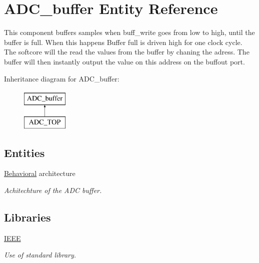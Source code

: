 \hypertarget{classADC__buffer}{\section{A\-D\-C\-\_\-buffer Entity Reference}
\label{classADC__buffer}
}


This component buffers samples when buff\-\_\-write goes from low to high, until the buffer is full. When this happens Buffer full is driven high for one clock cycle. The softcore will the read the values from the buffer by chaning the adress. The buffer will then instantly output the value on this address on the buffout port.  


Inheritance diagram for A\-D\-C\-\_\-buffer\-:\begin{figure}[H]
\begin{center}
\leavevmode
\includegraphics[height=2.000000cm]{classADC__buffer}
\end{center}
\end{figure}
\subsection*{Entities}
\begin{DoxyCompactItemize}
\item 
\hyperlink{classADC__buffer_1_1Behavioral}{Behavioral} architecture
\begin{DoxyCompactList}\small\item\em Achitechture of the A\-D\-C buffer. \end{DoxyCompactList}\end{DoxyCompactItemize}
\subsection*{Libraries}
 \begin{DoxyCompactItemize}
\item 
\hypertarget{classADC__buffer_ae4f03c286607f3181e16b9aa12d0c6d4}{\hyperlink{classADC__buffer_ae4f03c286607f3181e16b9aa12d0c6d4}{I\-E\-E\-E} }\label{classADC__buffer_ae4f03c286607f3181e16b9aa12d0c6d4}

\begin{DoxyCompactList}\small\item\em Use of standard library. \end{DoxyCompactList}\end{DoxyCompactItemize}
